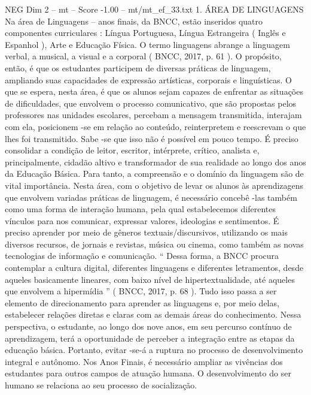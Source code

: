 \begin{textsample}{NEG Dim 2 – mt – Score -1.00 – mt/mt\_ef\_33.txt}  \label{ex:f2_neg_070}
1.
ÁREA DE LINGUAGENS Na área de Linguagens – anos finais, da BNCC, estão inseridos quatro componentes curriculares : Língua Portuguesa, Língua Estrangeira ( Inglês e Espanhol ), Arte e Educação Física.
O termo linguagens abrange a linguagem verbal, a musical, a visual e a corporal ( BNCC, 2017, p. 61 ).
O propósito, então, é que os estudantes participem de diversas práticas de linguagem, ampliando suas capacidades de expressão artísticas, corporais e linguísticas.
O que se espera, nesta área, é que os alunos sejam capazes de enfrentar as situações de dificuldades, que envolvem o processo comunicativo, que são propostas pelos professores nas unidades escolares, percebam a mensagem transmitida, interajam com ela, posicionem -se em relação ao conteúdo, reinterpretem e reescrevam o que lhes foi transmitido.
Sabe -se que isso não é possível em pouco tempo.
É preciso consolidar a condição de leitor, escritor, intérprete, crítico, analista e, principalmente, cidadão altivo e transformador de sua realidade ao longo dos anos da Educação Básica.
Para tanto, a compreensão e o domínio da linguagem são de vital importância.
Nesta área, com o objetivo de levar os alunos às aprendizagens que envolvem variadas práticas de linguagem, é necessário concebê -las também como uma forma de interação humana, pela qual estabelecemos diferentes vínculos para nos comunicar, expressar valores, ideologias e sentimentos.
É preciso aprender por meio de gêneros textuais/discursivos, utilizando os mais diversos recursos, de jornais e revistas, música ou cinema, como também as novas tecnologias de informação e comunicação. “ Dessa forma, a BNCC procura contemplar a cultura digital, diferentes linguagens e diferentes letramentos, desde aqueles basicamente lineares, com baixo nível de hipertextualidade, até aqueles que envolvem a hipermídia ” ( BNCC, 2017, p. 68 ).
Tudo isso passa a ser elemento de direcionamento para aprender as linguagens e, por meio delas, estabelecer relações diretas e claras com as demais áreas do conhecimento.
Nessa perspectiva, o estudante, ao longo dos nove anos, em seu percurso contínuo de aprendizagem, terá a oportunidade de perceber a integração entre as etapas da educação básica.
Portanto, evitar -se-á a ruptura no processo de desenvolvimento integral e autônomo.
Nos Anos Finais, é necessário ampliar as vivências dos estudantes para outros campos de atuação humana.
O desenvolvimento do ser humano se relaciona ao seu processo de socialização.

\end{textsample}
